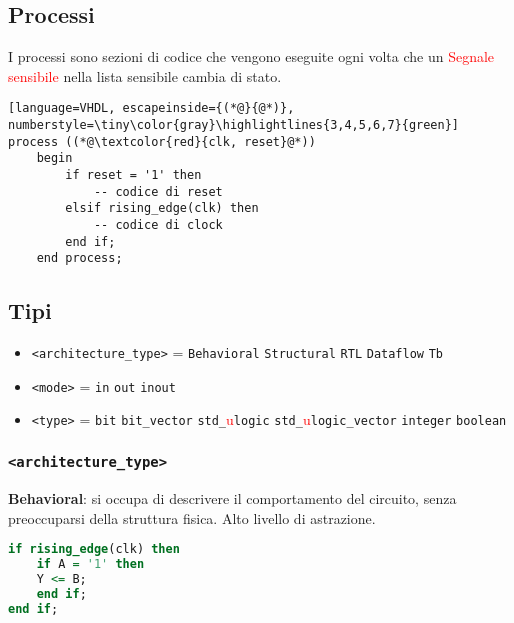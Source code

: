     \subsection{Processi}
        I processi sono sezioni di codice che vengono eseguite ogni volta che un \textcolor{red}{Segnale sensibile} nella lista sensibile cambia di stato.
        \begin{lstlisting}[language=VHDL, escapeinside={(*@}{@*)}, numberstyle=\tiny\color{gray}\highlightlines{3,4,5,6,7}{green}]
process ((*@\textcolor{red}{clk, reset}@*))
    begin
        if reset = '1' then
            -- codice di reset
        elsif rising_edge(clk) then
            -- codice di clock
        end if;
    end process;
        \end{lstlisting}


    \subsection{Tipi}
        \begin{itemize}
            \item \texttt{<architecture\_type>} = \texttt{Behavioral} \textbar{} \texttt{Structural} \textbar{} \texttt{RTL} \textbar{} \texttt{Dataflow} \textbar{} \texttt{Tb}
            \item \texttt{<mode>} = \texttt{in} \textbar{} \texttt{out} \textbar{} \texttt{inout}
            \item \texttt{<type>} = \texttt{bit} \textbar{} \texttt{bit\_vector} \textbar{} \texttt{std\_}\textcolor{red}{u}\texttt{logic} \textbar{} \texttt{std\_}\textcolor{red}{u}\texttt{logic\_vector} \textbar{} \texttt{integer} \textbar{} \texttt{boolean}
        \end{itemize}
        


        \subsubsection{\texttt{<architecture\_type>}}
            \textbf{Behavioral}: si occupa di descrivere il comportamento del circuito, senza preoccuparsi della struttura fisica. Alto livello di astrazione.
            \begin{lstlisting}[language=VHDL]
if rising_edge(clk) then
    if A = '1' then
    Y <= B;
    end if;
end if;
            \end{lstlisting}


